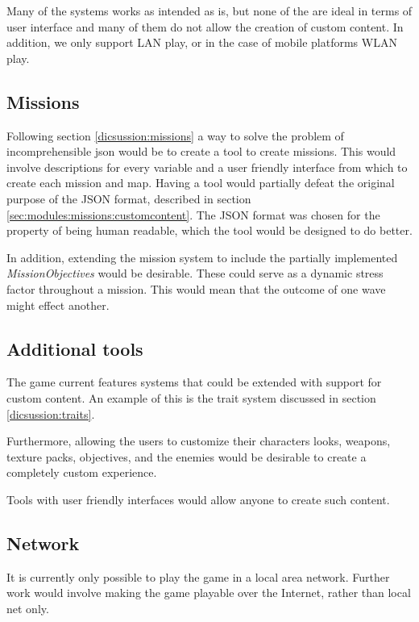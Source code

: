 Many of the systems works as intended as is, but none of the are ideal in terms of user interface and many of them do not allow the creation of custom content.
In addition, we only support LAN play, or in the case of mobile platforms WLAN play.

\subsection{Missions}
Following section \ref{dicsussion:missions} a way to solve the problem of incomprehensible json would be to create a tool to create missions.
This would involve descriptions for every variable and a user friendly interface from which to create each mission and map.
Having a tool would partially defeat the original purpose of the JSON format, described in section \ref{sec:modules:missions:customcontent}.
The JSON format was chosen for the property of being human readable, which the tool would be designed to do better.

In addition, extending the mission system to include the partially implemented \textit{MissionObjectives} would be desirable.
These could serve as a dynamic stress factor throughout a mission.
This would mean that the outcome of one wave might effect another.

\subsection{Additional tools}
The game current features systems that could be extended with support for custom content.
An example of this is the trait system discussed in section \ref{dicsussion:traits}.

Furthermore, allowing the users to customize their characters looks, weapons, texture packs, objectives, and the enemies would be desirable to create a completely custom experience.

Tools with user friendly interfaces would allow anyone to create such content.

\subsection{Network}

It is currently only possible to play the game in a local area network.
Further work would involve making the game playable over the Internet, rather than local net only.

